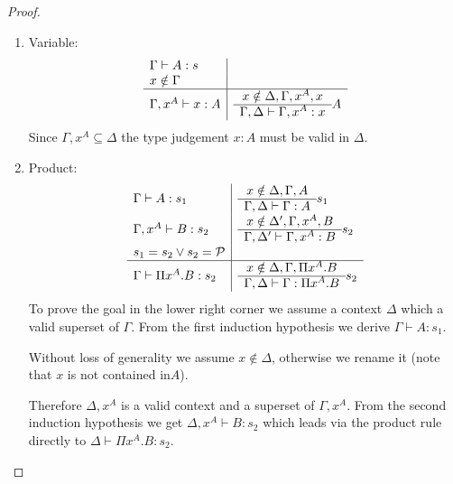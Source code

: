 \begin{lemma}
\begin{proof}
{\begin{enumerate}
\begin{enumerate}
                \item Variable:
                $$
                \begin{array}{l|l}
                    \Gamma \vdash A: s
                    \\
                    x \notin \Gamma
                    \\
                    \hline
                    \Gamma, x^A \vdash x : A
                    &
                    \begin{array}{c}  x \notin \Delta, \Gamma,x^A, x  \\ \hline  \Gamma,\Delta \vdash \Gamma,x^A : x \end{array} A
                \end{array}
                $$
                Since $\Gamma,x^A \subseteq \Delta$ the type judgement $x: A$
                    must be valid in $\Delta$.

                \item Product:
                $$
                \begin{array}{l|l}
                    \Gamma \vdash A: s_1
                    &
                    \begin{array}{c}  x \notin \Delta, \Gamma, A  \\ \hline  \Gamma,\Delta \vdash \Gamma : A \end{array} {s_1}
                    \\
                    \Gamma,x^A \vdash B: s_2
                    &
                    \begin{array}{c}  x \notin \Delta', \Gamma,x^A, B  \\ \hline  \Gamma,\Delta' \vdash \Gamma,x^A : B \end{array} {s_2}
                    \\
                    s_1 = s_2 \lor s_2 = {\cal P}
                    \\
                    \hline
                    \Gamma \vdash \Pi x^A.B : s_2
                    &
                    \begin{array}{c}  x \notin \Delta, \Gamma, \Pi x^A.B  \\ \hline  \Gamma,\Delta \vdash \Gamma : \Pi x^A.B \end{array} {s_2}
                \end{array}
                $$
                To prove the goal in the lower right corner we assume a context
                    $\Delta$ which a valid superset of $\Gamma$. From the
                    first induction hypothesis we derive $\Gamma \vdash A: s_1$.

                Without loss of generality we assume $x \notin \Delta$,
                    otherwise we rename it (note that $x$ is not contained
                    in$A$).

                Therefore $\Delta, x^A$ is a valid context and a superset of
                    $\Gamma, x^A$. From the second induction hypothesis we get
                    $\Delta, x^A \vdash B: s_2$ which leads via the product rule
                    directly to $\Delta \vdash \Pi x^A. B: s_2$.


\end{enumerate}
\end{enumerate}}
\end{proof}
\end{lemma}
